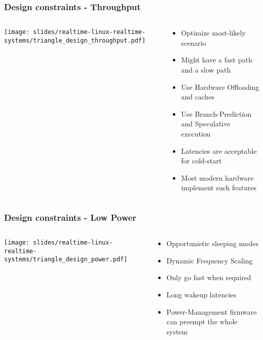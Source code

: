 \begin{frame}
        \frametitle{Design constraints - Throughput}
        \begin{columns}
        \begin{column}{0.35\textwidth}
        \texttt{[image: slides/realtime-linux-realtime-systems/triangle\_design\_throughput.pdf]}
        \end{column}
                \begin{column}{0.65\textwidth}
                        \begin{itemize}
                                \item Optimize most-likely scenario
                                \item Might have a fast path and a slow path
                                \item Use Hardware Offloading and caches
                                \item Use Branch-Prediction and Speculative execution
                                \item Latencies are acceptable for cold-start
                                \item Most modern hardware implement such features
                        \end{itemize}
                \end{column}
        \end{columns}
\end{frame}

\begin{frame}
        \frametitle{Design constraints - Low Power}
        \begin{columns}
        \begin{column}{0.35\textwidth}
        \texttt{[image: slides/realtime-linux-realtime-systems/triangle\_design\_power.pdf]}
        \end{column}
                \begin{column}{0.65\textwidth}
                        \begin{itemize}
                                \item Opportunistic sleeping modes
                                \item Dynamic Frequency Scaling
                                \item Only go fast when required
                                \item Long wakeup latencies
                                \item Power-Management firmware can preempt the whole system
                        \end{itemize}
                \end{column}
        \end{columns}
\end{frame}

